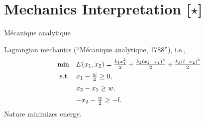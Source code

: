 \documentclass[9pt]{beamer}
\begin{document}



\section{Mechanics Interpretation [$\star$]}

\begin{frame}{M\'ecanique analytique}

  \begin{center}
    
  \end{center}
  
  \vfill

  Lagrangian mechanics (``M\'ecanique analytique, 1788''), i.e.,
  \[
    \begin{array}{rl}
      \min & E(x_1, x_2) = \frac{k_1 x_1^2}{2} + \frac{k_2 (x_2-x_1)^2}{2} + \frac{k_3 (l-x_2)^2}{2}\\[0.5em]
      \mathrm{s.t.} & x_1 - \frac{w}{2}\geq 0, \\[0.5em]
           & x_2-x_1 \geq w, \\[0.5em]
           & -x_2 - \frac{w}{2} \geq -l.
    \end{array}
  \]
  Nature minimizes energy.
  
\end{frame}
\end{document}
